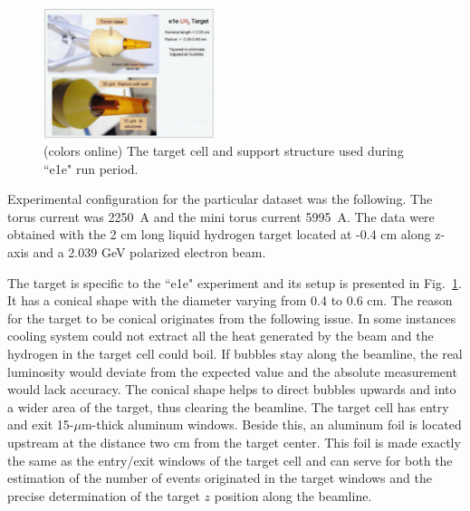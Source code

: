 \documentclass[prc,twocolumn,superscriptaddress,showpacs,amssymb,amsmath,amsfonts,linenumbers,aps]{revtex4-1}
\begin{document}
\begin{figure}[htp]
\begin{center}
 \includegraphics[width=5cm,keepaspectratio]{pictures/vertex/e1e_target_new.pdf}
\vspace{-0.1cm}
\caption{(colors online) The target cell and support structure used during ``e1e" run period.}
\label{fig:e1e_target}
\end{center}
\end{figure} 

Experimental configuration for the particular dataset was the following. The torus current was 2250~A and the mini torus current 5995~A.
The data  were obtained with the 2 cm long liquid hydrogen target located at -0.4 cm along z-axis and a 2.039 GeV polarized electron beam.


The target is specific to the ``e1e" experiment and its setup is presented in Fig.~\ref{fig:e1e_target}. It has a conical shape with the diameter varying from 0.4 to 0.6 cm. The reason for the target to be conical originates from the following issue. In some instances cooling system could not extract all the heat generated by the beam and the hydrogen in the target cell could boil. If bubbles stay along the beamline, the real luminosity would deviate from the expected value and the absolute measurement would lack accuracy. The conical shape helps to direct bubbles upwards and into a wider area of the target, thus clearing the beamline. The target cell has entry and exit 15-$\mu$m-thick aluminum windows. Beside this, an aluminum foil is located upstream at the distance two cm from the target center.  This foil is made exactly the same as the entry/exit windows of the target cell and can serve for both  the estimation of the number of events originated in the target windows and the precise determination of the target $z$ position along the beamline.
\end{document}
